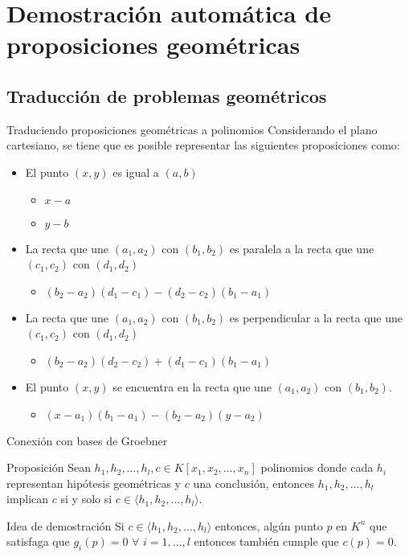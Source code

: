 \documentclass[10pt]{beamer}
\newcommand{\gen}[1]{\ensuremath{\langle #1\rangle}}
\begin{document}
\section{Demostración automática de proposiciones geométricas}
\subsection{Traducción de problemas geométricos}

\begin{frame}{Traduciendo proposiciones geométricas a polinomios}
	Considerando el plano cartesiano, se tiene que es posible representar las siguientes proposiciones como:
	\begin{itemize}
		\item {El punto $(x,y)$ es igual a $(a,b)$}
			\begin{itemize}
				\item $x-a$
				\item $y-b$
			\end{itemize}
		\pause
		\item La recta que une $(a_1,a_2)$ con $(b_1,b_2)$ es paralela a la recta que une $(c_1,c_2)$ con $(d_1,d_2)$
			\begin{itemize}
				\item $(b_2-a_2)(d_1-c_1)-(d_2-c_2)(b_1-a_1)$
			\end{itemize}
		\pause
		\item La recta que une $(a_1,a_2)$ con $(b_1,b_2)$ es perpendicular a la recta que une $(c_1,c_2)$ con $(d_1,d_2)$
			\begin{itemize}
				\item $(b_2-a_2)(d_2-c_2)+(d_1-c_1)(b_1-a_1)$
			\end{itemize}
		\pause
		\item El punto $(x,y)$ se encuentra en la recta que une $(a_1,a_2)$ con $(b_1,b_2)$.
			\begin{itemize}
				\item $(x-a_1)(b_1-a_1)-(b_2-a_2)(y-a_2)$
			\end{itemize}
	\end{itemize}
\end{frame}
\begin{frame}{Conexión con bases de Groebner}
	\begin{block}{Proposición}
		Sean $h_1,h_2, \ldots,h_l,c \in K[x_1,x_2,\ldots,x_n]$ polinomios donde cada $h_i$ representan hipótesis geométricas y $c$ una conclusión, entonces $h_1,h_2, \ldots,h_l$ implican $c$ si y solo si $c \in \gen{h_1,h_2,\ldots,h_l}$.
	\end{block}
	\begin{block}{Idea de demostración}
		Si $c \in \gen{h_1,h_2,\ldots,h_l}$ entonces, algún punto $p$ en $K^n$ que satisfaga que $g_i(p)=0$ $\forall$ $i=1,\ldots,l$ entonces también cumple que $c(p)=0$.
	\end{block}
\end{frame}
\end{document}
